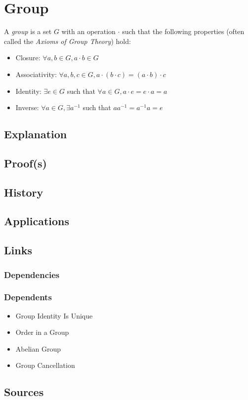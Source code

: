 \section*{Group}

A \textit{group} is a set $G$ with an operation $\cdot$ such that the following properties (often called the \textit{Axioms of Group Theory}) hold:

\begin{itemize}
\item Closure: $\forall a, b \in G, a \cdot b \in G$
\item Associativity: $\forall a, b, c \in G, a \cdot (b \cdot c) = (a \cdot b) \cdot c$
\item Identity: $\exists e \in G$ such that $\forall a \in G, a \cdot e = e \cdot a = a$
\item Inverse: $\forall a \in G, \exists a^{-1}$ such that $a a^{-1} = a^{-1} a = e$
\end{itemize}

\subsection*{Explanation}

\subsection*{Proof(s)}

\subsection*{History}

\subsection*{Applications}

\subsection*{Links}
\subsubsection*{Dependencies}
\subsubsection*{Dependents}
\begin{itemize}
\item Group Identity Is Unique
\item Order in a Group
\item Abelian Group
\item Group Cancellation
\end{itemize}

\subsection*{Sources}
